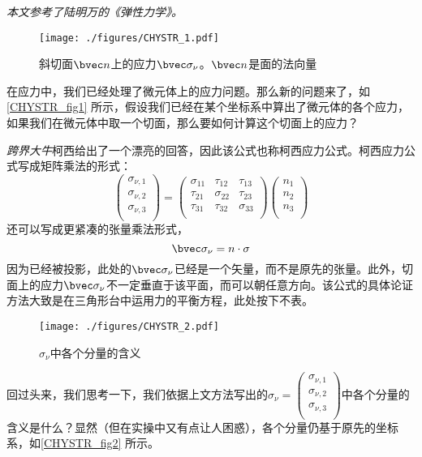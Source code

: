 
\textsl{本文参考了陆明万的《弹性力学》。}

\begin{figure}[ht]
\centering
\texttt{[image: ./figures/CHYSTR\_1.pdf]}
\caption{斜切面$\bvec n$上的应力$\bvec \sigma_\nu$。$\bvec n$是面的法向量} \label{CHYSTR_fig1}
\end{figure}

在应力中，我们已经处理了微元体上的应力问题。那么新的问题来了，如\autoref{CHYSTR_fig1} 所示，假设我们已经在某个坐标系中算出了微元体的各个应力，如果我们在微元体中取一个切面，那么要如何计算这个切面上的应力？

\textsl{跨界大牛}柯西给出了一个漂亮的回答，因此该公式也称柯西应力公式。柯西应力公式写成矩阵乘法的形式：
\begin{equation}\label{CHYSTR_eq1}
\begin{pmatrix}
\sigma_{\nu,1}\\
\sigma_{\nu,2}\\
\sigma_{\nu,3}\\
\end{pmatrix}
=
\begin{pmatrix}
\sigma_{11} & \tau_{12} & \tau_{13} \\
\tau_{21} & \sigma_{22} & \tau_{23} \\
\tau_{31} & \tau_{32} & \sigma_{33} \\
\end{pmatrix}
\begin{pmatrix}
n_1\\
n_2\\
n_3\\
\end{pmatrix}
\end{equation}
还可以写成更紧凑的张量乘法形式，
\begin{equation}
\bvec \sigma_\nu = n \cdot \sigma
\end{equation}
因为已经被投影，此处的$\bvec \sigma_\nu$已经是一个矢量，而不是原先的张量。此外，切面上的应力$\bvec \sigma_\nu$不一定垂直于该平面，而可以朝任意方向。该公式的具体论证方法大致是在三角形台中运用力的平衡方程，此处按下不表。

\begin{figure}[ht]
\centering
\texttt{[image: ./figures/CHYSTR\_2.pdf]}
\caption{$\sigma_\nu$中各个分量的含义} \label{CHYSTR_fig2}
\end{figure}

回过头来，我们思考一下，我们依据上文方法写出的$\sigma_\nu=
\begin{pmatrix}
\sigma_{\nu,1}\\
\sigma_{\nu,2}\\
\sigma_{\nu,3}\\
\end{pmatrix}$中各个分量的含义是什么？显然（但在实操中又有点让人困惑），各个分量仍基于原先的坐标系，如\autoref{CHYSTR_fig2} 所示。


